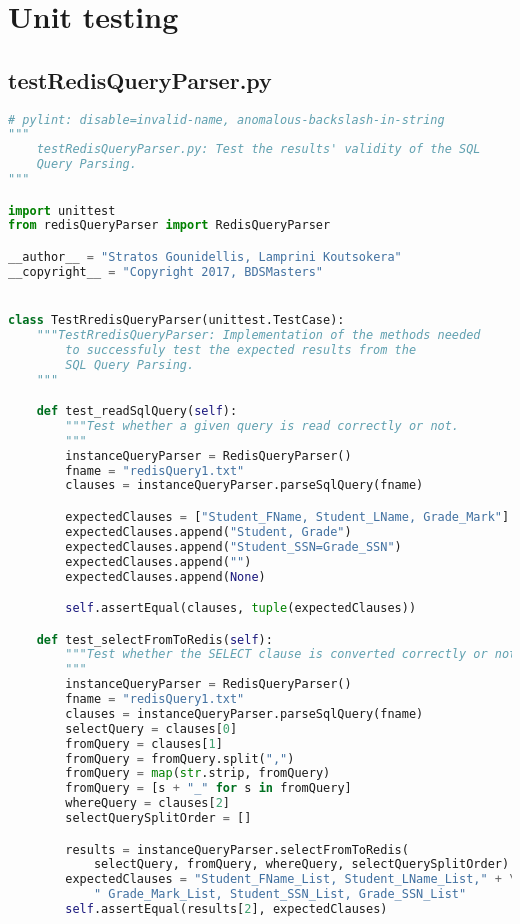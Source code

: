 \documentclass[11pt]{article}
\begin{document}
\section{Unit testing}\label{unit-testing}

\subsection{testRedisQueryParser.py }\label{testRedisQueryParser.py}


\begin{lstlisting}[language=Python]
# pylint: disable=invalid-name, anomalous-backslash-in-string
"""
    testRedisQueryParser.py: Test the results' validity of the SQL
    Query Parsing.
"""

import unittest
from redisQueryParser import RedisQueryParser

__author__ = "Stratos Gounidellis, Lamprini Koutsokera"
__copyright__ = "Copyright 2017, BDSMasters"


class TestRredisQueryParser(unittest.TestCase):
    """TestRredisQueryParser: Implementation of the methods needed
        to successfuly test the expected results from the
        SQL Query Parsing.
    """

    def test_readSqlQuery(self):
        """Test whether a given query is read correctly or not.
        """
        instanceQueryParser = RedisQueryParser()
        fname = "redisQuery1.txt"
        clauses = instanceQueryParser.parseSqlQuery(fname)

        expectedClauses = ["Student_FName, Student_LName, Grade_Mark"]
        expectedClauses.append("Student, Grade")
        expectedClauses.append("Student_SSN=Grade_SSN")
        expectedClauses.append("")
        expectedClauses.append(None)

        self.assertEqual(clauses, tuple(expectedClauses))

    def test_selectFromToRedis(self):
        """Test whether the SELECT clause is converted correctly or not.
        """
        instanceQueryParser = RedisQueryParser()
        fname = "redisQuery1.txt"
        clauses = instanceQueryParser.parseSqlQuery(fname)
        selectQuery = clauses[0]
        fromQuery = clauses[1]
        fromQuery = fromQuery.split(",")
        fromQuery = map(str.strip, fromQuery)
        fromQuery = [s + "_" for s in fromQuery]
        whereQuery = clauses[2]
        selectQuerySplitOrder = []

        results = instanceQueryParser.selectFromToRedis(
            selectQuery, fromQuery, whereQuery, selectQuerySplitOrder)
        expectedClauses = "Student_FName_List, Student_LName_List," + \
            " Grade_Mark_List, Student_SSN_List, Grade_SSN_List"
        self.assertEqual(results[2], expectedClauses)


\end{lstlisting}
\end{document}
